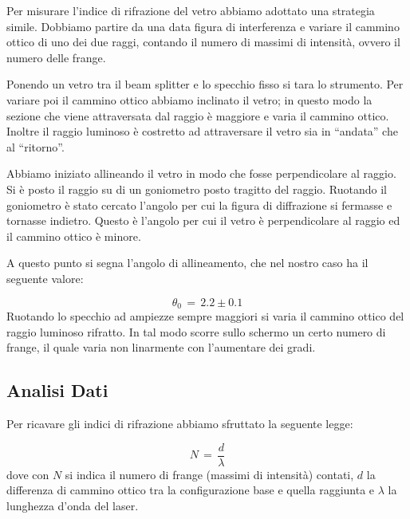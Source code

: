Per misurare l'indice di rifrazione del vetro abbiamo adottato una strategia simile. Dobbiamo partire da una data figura di interferenza e variare il cammino ottico di uno dei due raggi, contando il numero di massimi di intensità, ovvero il numero delle frange.

Ponendo un vetro tra il beam splitter e lo specchio fisso si tara lo strumento. Per variare poi il cammino ottico abbiamo
inclinato il vetro; in questo modo la sezione che viene attraversata dal raggio è maggiore e varia il cammino ottico.
Inoltre il raggio luminoso è costretto ad attraversare il vetro sia in ``andata'' che al ``ritorno''.

Abbiamo iniziato allineando il vetro in modo che fosse perpendicolare al raggio. Si è posto il raggio su di un goniometro posto
tragitto del raggio. Ruotando il goniometro è stato cercato l'angolo per cui la figura di diffrazione si fermasse e tornasse indietro.
Questo è l'angolo per cui il vetro è perpendicolare al raggio ed il cammino ottico è minore.

A questo punto si segna l'angolo di allineamento, che nel nostro caso ha il seguente valore:

\begin{equation}
	\theta_0 \,=\, 2.2 \pm 0.1
\end{equation}
%
Ruotando lo specchio ad ampiezze sempre maggiori si varia il cammino ottico del raggio luminoso rifratto.
In tal modo scorre sullo schermo un certo numero di frange, il quale varia non linarmente con l'aumentare dei gradi.

\subsection{Analisi Dati}

Per ricavare gli indici di rifrazione abbiamo sfruttato la seguente legge:

\begin{equation}
	N \,=\, \frac{d}{\lambda}
\end{equation}
%
dove con $N$ si indica il numero di frange (massimi di intensità) contati, $d$ la differenza di cammino
ottico tra la configurazione base e quella raggiunta e $\lambda$ la lunghezza d'onda del laser.

